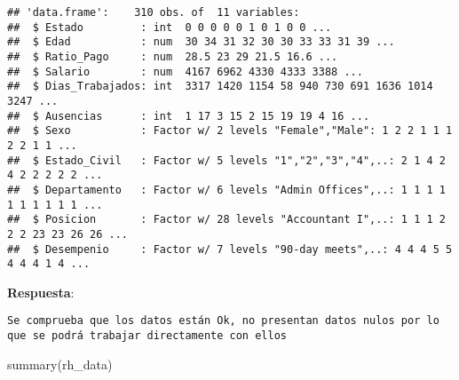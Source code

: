 \documentclass[
]{article}
\newenvironment{Shaded}{\begin{snugshade}}{\end{snugshade}}
\newcommand{\FunctionTok}[1]{\textcolor[rgb]{0.00,0.00,0.00}{#1}}
\newcommand{\NormalTok}[1]{#1}
\begin{document}
\begin{verbatim}
## 'data.frame':    310 obs. of  11 variables:
##  $ Estado         : int  0 0 0 0 0 1 0 1 0 0 ...
##  $ Edad           : num  30 34 31 32 30 30 33 33 31 39 ...
##  $ Ratio_Pago     : num  28.5 23 29 21.5 16.6 ...
##  $ Salario        : num  4167 6962 4330 4333 3388 ...
##  $ Dias_Trabajados: int  3317 1420 1154 58 940 730 691 1636 1014 3247 ...
##  $ Ausencias      : int  1 17 3 15 2 15 19 19 4 16 ...
##  $ Sexo           : Factor w/ 2 levels "Female","Male": 1 2 2 1 1 1 2 2 1 1 ...
##  $ Estado_Civil   : Factor w/ 5 levels "1","2","3","4",..: 2 1 4 2 4 2 2 2 2 2 ...
##  $ Departamento   : Factor w/ 6 levels "Admin Offices",..: 1 1 1 1 1 1 1 1 1 1 ...
##  $ Posicion       : Factor w/ 28 levels "Accountant I",..: 1 1 1 2 2 2 23 23 26 26 ...
##  $ Desempenio     : Factor w/ 7 levels "90-day meets",..: 4 4 4 5 5 4 4 4 1 4 ...
\end{verbatim}

\textbf{Respuesta}:

\begin{verbatim}
Se comprueba que los datos están Ok, no presentan datos nulos por lo que se podrá trabajar directamente con ellos
\end{verbatim}

\begin{Shaded}
\begin{Highlighting}[]
\FunctionTok{summary}\NormalTok{(rh\_data)}
\end{Highlighting}
\end{Shaded}
\end{document}
